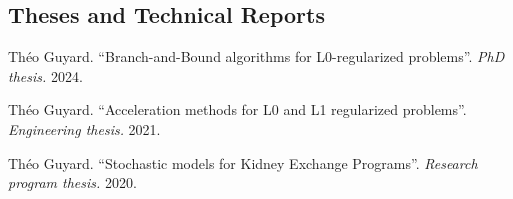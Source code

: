 \subsection*{Theses and Technical Reports}
\label{publications:theses-and-technical-reports}

\begin{etaremune}
    \item Théo Guyard. ``Branch-and-Bound algorithms for L0-regularized problems''. \textit{PhD thesis.} 2024.
    \item Théo Guyard. ``Acceleration methods for L0 and L1 regularized problems''. \textit{Engineering thesis.} 2021.
    \item Théo Guyard. ``Stochastic models for Kidney Exchange Programs''. \textit{Research program thesis.} 2020.
\end{etaremune}




